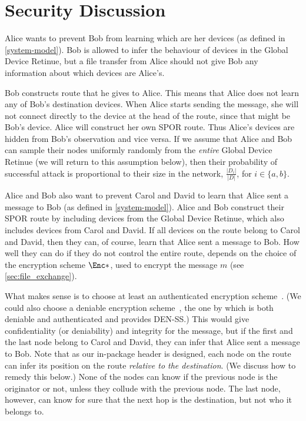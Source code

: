 \section{Security Discussion}%
\label{security-discussion}

Alice wants to prevent Bob from learning which are her devices (as defined in 
\cref{system-model}).
Bob is allowed to infer the behaviour of devices in the Global Device Retinue, 
but a file transfer from Alice should not give Bob any information about which 
devices are Alice's.

Bob constructs  route that he gives to Alice.
This means that Alice does not learn any of Bob's destination devices.
When Alice starts sending the message, she will not connect directly to the 
device at the head of the route, since that might be Bob's device.
Alice will construct her own \ac{SPOR} route.
Thus Alice's devices are hidden from Bob's observation and vice versa.
If we assume that Alice and Bob can sample their nodes uniformly randomly from 
the \emph{entire} Global Device Retinue (we will return to this assumption 
below), then their probability of successful attack is proportional to their 
size in the network, \ie \(\frac{|D_i|}{|D|}\), for \(i\in \{a,b\}\).

Alice and Bob also want to prevent Carol and David to learn that Alice sent a 
message to Bob (as defined in \cref{system-model}).
Alice and Bob construct their \ac{SPOR} route by including devices from the 
Global Device Retinue, which also includes devices from Carol and David.
If all devices on the route belong to Carol and David, then they can, of course, 
learn that Alice sent a message to Bob.
How well they can do if they do not control the entire route, depends on the 
choice of the encryption scheme \(\Enc*\), used to encrypt the message \(m\) 
(see \cref{sec:file_exchange}).

What makes sense is to choose at least an authenticated encryption 
scheme~\cite{AuthEncryption}.
(We could also choose a deniable encryption scheme~\cite{DeniableEncryption}, 
\eg the one by \textcite{OTPKX} which is both deniable and authenticated and 
provides \ac{DEN-SS}.)
This would give confidentiality (or deniability) and integrity for the message, 
but if the first and the last node belong to Carol and David, they can infer 
that Alice sent a message to Bob.
Note that as our in-package header is designed, each node on the route can infer 
its position on the route \emph{relative to the destination}.
(We discuss how to remedy this below.)
None of the nodes can know if the previous node is the originator or not, unless 
they collude with the previous node.
The last node, however, can know for sure that the next hop is the destination, 
but not who it belongs to.

